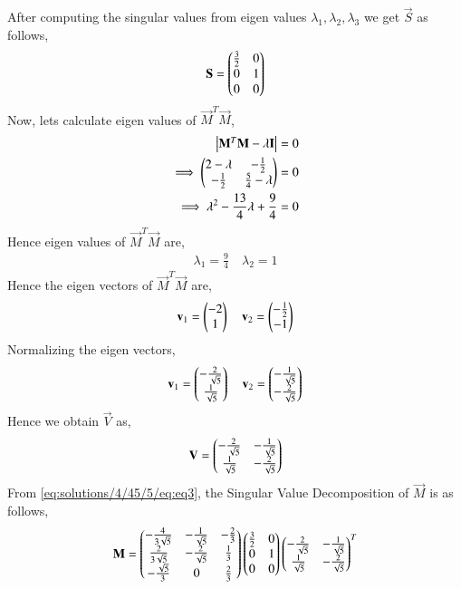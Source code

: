 After computing the singular values from eigen values $\lambda_1, \lambda_2, \lambda_3$ we get $\vec{S}$ as follows,
\begin{align}
\mathbf{S}=\begin{pmatrix}\frac{3}{2}&0\\0&1\\0&0\end{pmatrix}
\end{align}
Now, lets calculate eigen values of $\vec{M}^T\vec{M}$,
\begin{align}
\begin{vmatrix}\mathbf{M}^T\mathbf{M} - \lambda\mathbf{I}\end{vmatrix} &= 0\\
\implies\begin{pmatrix}2-\lambda&-\frac{1}{2}\\-\frac{1}{2}&\frac{5}{4}-\lambda\end{pmatrix} &=0\\
\implies\lambda^2-\frac{13}{4}\lambda+\frac{9}{4} &=0
\end{align}
Hence eigen values of $\vec{M}^T\vec{M}$ are,
\begin{align}
\lambda_1 = \frac{9}{4}\quad
\lambda_2 = 1
\end{align}
Hence the eigen vectors of $\vec{M}^T\vec{M}$ are,
\begin{align}
\mathbf{v}_1=\begin{pmatrix}-2\\1\end{pmatrix} \quad
\mathbf{v}_2=\begin{pmatrix}-\frac{1}{2}\\-1\end{pmatrix}
\end{align}
Normalizing the eigen vectors,
\begin{align}
\mathbf{v}_1=\begin{pmatrix}-\frac{2}{\sqrt{5}}\\\frac{1}{\sqrt{5}}\end{pmatrix} \quad
\mathbf{v}_2=\begin{pmatrix}-\frac{1}{\sqrt{5}}\\-\frac{2}{\sqrt{5}}\end{pmatrix}
\end{align}
Hence we obtain $\vec{V}$ as,
\begin{align}
\mathbf{V}=\begin{pmatrix}-\frac{2}{\sqrt{5}}&-\frac{1}{\sqrt{5}}\\\frac{1}{\sqrt{5}}&-\frac{2}{\sqrt{5}}\end{pmatrix}
\end{align}
From \eqref{eq:solutions/4/45/5/eq:eq3}, the Singular Value Decomposition of $\vec{M}$ is as follows,
\begin{align}
\mathbf{M} = \begin{pmatrix}-\frac{4}{3\sqrt{5}}&-\frac{1}{\sqrt{5}}&-\frac{2}{3}\\\frac{2}{3\sqrt{5}}&-\frac{2}{\sqrt{5}}&\frac{1}{3}\\-\frac{\sqrt{5}}{3}&0&\frac{2}{3}\end{pmatrix}\begin{pmatrix}\frac{3}{2}&0\\0&1\\0&0\end{pmatrix}\begin{pmatrix}-\frac{2}{\sqrt{5}}&-\frac{1}{\sqrt{5}}\\\frac{1}{\sqrt{5}}&-\frac{2}{\sqrt{5}}\end{pmatrix}^T
\end{align}
